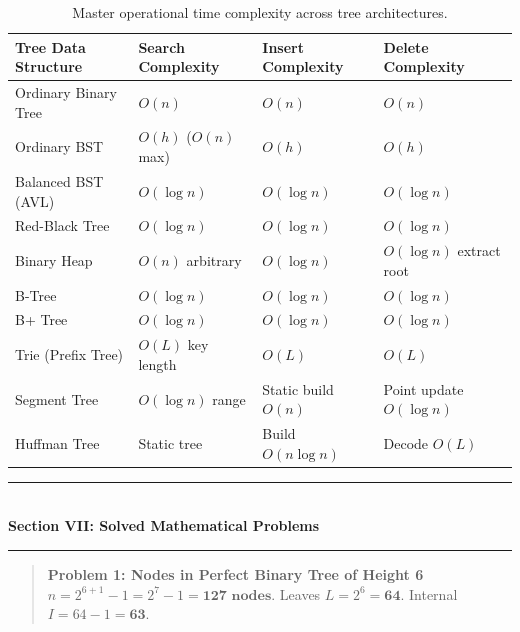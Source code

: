 \begin{table}[htbp]
\centering
\small
\begin{tabularx}{\textwidth}{l X X X}
\toprule
\textbf{Tree Data Structure} & \textbf{Search Complexity} & \textbf{Insert Complexity} & \textbf{Delete Complexity} \\
\midrule
Ordinary Binary Tree & $O(n)$              & $O(n)$              & $O(n)$ \\
Ordinary BST         & $O(h)$ ($O(n)$ max)& $O(h)$              & $O(h)$ \\
Balanced BST (AVL)   & $O(\log n)$         & $O(\log n)$         & $O(\log n)$ \\
Red-Black Tree       & $O(\log n)$         & $O(\log n)$         & $O(\log n)$ \\
Binary Heap          & $O(n)$ arbitrary    & $O(\log n)$         & $O(\log n)$ extract root \\
B-Tree               & $O(\log n)$         & $O(\log n)$         & $O(\log n)$ \\
B+ Tree              & $O(\log n)$         & $O(\log n)$         & $O(\log n)$ \\
Trie (Prefix Tree)   & $O(L)$ key length   & $O(L)$              & $O(L)$ \\
Segment Tree         & $O(\log n)$ range   & Static build $O(n)$ & Point update $O(\log n)$ \\
Huffman Tree         & Static tree         & Build $O(n \log n)$ & Decode $O(L)$ \\
\bottomrule
\end{tabularx}
\caption{Master operational time complexity across tree architectures.}
\end{table}

\begin{center}
\vspace{1em}
{\color{primary}\rule{0.45\textwidth}{1.2pt}}\\[4pt]
{\Large\bfseries\color{primary} Section VII: Solved Mathematical Problems}\\[2pt]
{\color{primary}\rule{0.45\textwidth}{1.2pt}}
\vspace{0.5em}
\end{center}

\begin{quote}
\textbf{Problem 1: Nodes in Perfect Binary Tree of Height 6}\\
$n = 2^{6+1} - 1 = 2^7 - 1 = \mathbf{127 \text{ nodes}}$. Leaves $L = 2^6 = \mathbf{64}$. Internal $I = 64 - 1 = \mathbf{63}$.
\end{quote}

